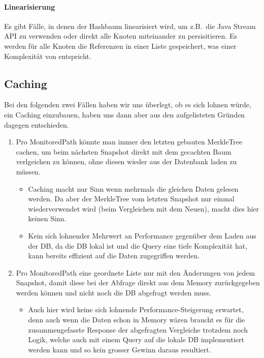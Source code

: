 \documentclass[a4paper,12pt]{report}
\begin{document}
    \paragraph{Linearisierung}
    Es gibt Fälle, in denen der Hashbaum linearisiert wird, um z.B.\ die Java Stream API zu verwenden oder direkt alle Knoten miteinander zu persisitieren.
    Es werden für alle Knoten die Referenzen in einer Liste gespeichert, was einer Komplexität von   entspricht.

    \subsection{Caching}
    Bei den folgenden zwei Fällen haben wir uns überlegt, ob es sich lohnen würde, ein Caching einzubauen,
    haben uns dann aber aus den aufgelisteten Gründen dagegen entschieden.

    \begin{enumerate}
        \item Pro MonitoredPath könnte man immer den letzten gebauten MerkleTree cachen, um beim nächsten Snapshot
        direkt mit dem gecachten Baum verlgeichen zu können, ohne diesen wieder aus der Datenbank laden zu müssen.
        \begin{itemize}
            \item Caching macht nur Sinn wenn mehrmals die gleichen Daten gelesen werden.
            Da aber der MerkleTree vom letzten Snapshot nur einmal wiederverwendet wird (beim Vergleichen mit dem Neuen), macht dies hier keinen Sinn.
            \item Kein sich lohnender Mehrwert an Performance gegenüber dem Laden aus der DB, da die DB lokal ist und die Query
            eine tiefe Komplexität hat, kann bereits effizient auf die Daten zugegriffen werden.
        \end{itemize}
        \item Pro MonitoredPath eine geordnete Liste nur mit den Änderungen von jedem Snapshot, damit diese bei der Abfrage
        direkt aus dem Memory zurückgegeben werden können und nicht noch die DB abgefragt werden muss.
        \begin{itemize}
            \item Auch hier wird keine sich lohnende Performance-Steigerung erwartet, denn auch wenn die Daten schon in Memory wären
            braucht es für die zusammengefasste Response der abgefragten Vergleiche trotzdem noch Logik,
            welche auch mit einem Query auf die lokale DB implementiert werden kann und so kein grosser Gewinn daraus resultiert.
        \end{itemize}
    \end{enumerate}
\end{document}
